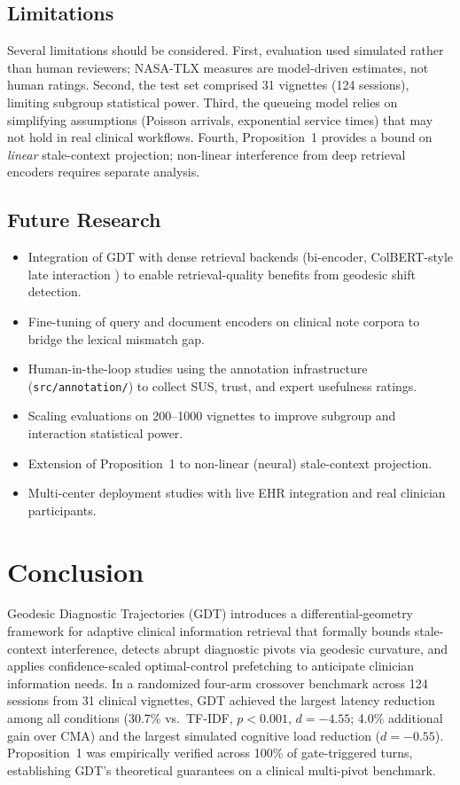 \documentclass[11pt]{article}
\begin{document}
\subsection{Limitations}
Several limitations should be considered. First, evaluation used simulated rather than human reviewers; NASA-TLX measures are model-driven estimates, not human ratings. Second, the test set comprised 31 vignettes (124 sessions), limiting subgroup statistical power. Third, the queueing model relies on simplifying assumptions (Poisson arrivals, exponential service times) that may not hold in real clinical workflows. Fourth, Proposition~1 provides a bound on \emph{linear} stale-context projection; non-linear interference from deep retrieval encoders requires separate analysis.

\subsection{Future Research}
\begin{itemize}
  \item Integration of GDT with dense retrieval backends (bi-encoder, ColBERT-style late interaction \citep{khattab20}) to enable retrieval-quality benefits from geodesic shift detection.
  \item Fine-tuning of query and document encoders on clinical note corpora to bridge the lexical mismatch gap.
  \item Human-in-the-loop studies using the annotation infrastructure (\texttt{src/annotation/}) to collect SUS, trust, and expert usefulness ratings.
  \item Scaling evaluations on 200--1000 vignettes to improve subgroup and interaction statistical power.
  \item Extension of Proposition~1 to non-linear (neural) stale-context projection.
  \item Multi-center deployment studies with live EHR integration and real clinician participants.
\end{itemize}

\section{Conclusion}
\label{sec:conclusion}

Geodesic Diagnostic Trajectories (GDT) introduces a differential-geometry framework for adaptive clinical information retrieval that formally bounds stale-context interference, detects abrupt diagnostic pivots via geodesic curvature, and applies confidence-scaled optimal-control prefetching to anticipate clinician information needs. In a randomized four-arm crossover benchmark across 124 sessions from 31 clinical vignettes, GDT achieved the largest latency reduction among all conditions (30.7\% vs.\ TF-IDF, $p < 0.001$, $d = -4.55$; 4.0\% additional gain over CMA) and the largest simulated cognitive load reduction ($d = -0.55$). Proposition~1 was empirically verified across 100\% of gate-triggered turns, establishing GDT's theoretical guarantees on a clinical multi-pivot benchmark.
\end{document}
